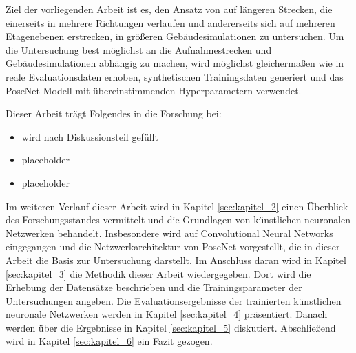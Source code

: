 Ziel der vorliegenden Arbeit ist es, den Ansatz von \citet{acharyaBIMPoseNetIndoorCamera2019} auf längeren Strecken, die einerseits in mehrere Richtungen verlaufen und andererseits sich auf mehreren Etagenebenen erstrecken, in größeren Gebäudesimulationen zu untersuchen. Um die Untersuchung best möglichst an die Aufnahmestrecken und Gebäudesimulationen abhängig zu machen, wird möglichst gleichermaßen wie in \cite{acharyaBIMPoseNetIndoorCamera2019} reale Evaluationsdaten erhoben, synthetischen Trainingsdaten generiert und das PoseNet Modell mit übereinstimmenden Hyperparametern verwendet.

Dieser Arbeit trägt Folgendes in die Forschung bei:
\begin{itemize}
	\item
	wird nach Diskussionsteil gefüllt
	\item
	placeholder
	\item
	placeholder
\end{itemize}

Im weiteren Verlauf dieser Arbeit wird in Kapitel \ref{sec:kapitel_2} einen Überblick des Forschungsstandes vermittelt und die Grundlagen von künstlichen neuronalen Netzwerken behandelt. Insbesondere wird auf Convolutional Neural Networks eingegangen und die Netzwerkarchitektur von PoseNet vorgestellt, die in dieser Arbeit die Basis zur Untersuchung darstellt. Im Anschluss daran wird in Kapitel \ref{sec:kapitel_3} die Methodik dieser Arbeit wiedergegeben. Dort wird die Erhebung der Datensätze beschrieben und die Trainingsparameter der Untersuchungen angeben. Die Evaluationsergebnisse der trainierten künstlichen neuronale Netzwerken werden in Kapitel \ref{sec:kapitel_4} präsentiert. Danach werden über die Ergebnisse in Kapitel \ref{sec:kapitel_5} diskutiert. Abschließend wird in Kapitel \ref{sec:kapitel_6} ein Fazit gezogen. 


